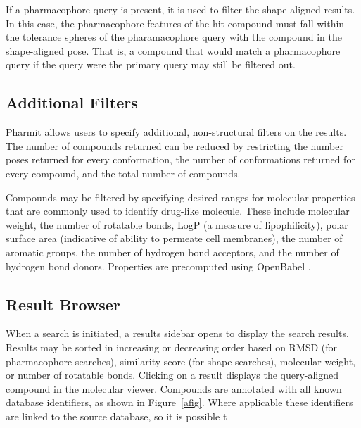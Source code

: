 If a pharmacophore query is present, it is used to filter the shape-aligned results. In this case, the pharmacophore features of the hit compound must fall within the tolerance spheres of the pharamacophore query with the compound in the shape-aligned pose. That is, a compound that would match a pharmacophore query if the query were the primary query may still be filtered out.
 
\subsection{Additional Filters}
Pharmit allows users to specify additional, non-structural filters on the results. The number of compounds returned can be reduced by restricting the number poses returned for every conformation, the number of conformations returned for every compound, and the total number of compounds.

Compounds may be filtered by specifying desired ranges for molecular properties that are commonly used to identify drug-like molecule.
These include molecular weight, the number of rotatable bonds, LogP (a measure of lipophilicity), polar surface area (indicative of ability to permeate cell membranes), the number of aromatic groups, the number of hydrogen bond acceptors, and the number of hydrogen bond donors.  Properties are precomputed using OpenBabel \cite{O_Boyle_2011}.

\subsection{Result Browser}
When a search is initiated, a results sidebar opens to display the search results. Results may be sorted in increasing or decreasing order based on RMSD (for pharmacophore searches), similarity score (for shape searches), molecular weight, or number of rotatable bonds. Clicking on a result displays the query-aligned compound in the molecular viewer.  Compounds are annotated with all known database identifiers, as shown in Figure~\ref{afig}. Where applicable these identifiers are linked to the source database, so it is possible t